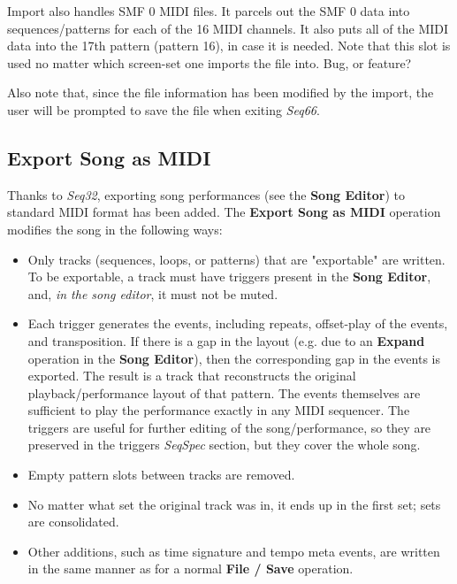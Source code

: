    Import also handles SMF 0 MIDI files.  It parcels out the SMF 0 data
   into sequences/patterns for each of the 16 MIDI channels.  It also puts
   all of the MIDI data into the 17th pattern (pattern 16), in case it is
   needed.  Note that this slot is used no matter which screen-set one imports
   the file into.  Bug, or feature?

   Also note that, since the file information has been modified by the import,
   the user will be prompted to save the file when exiting \textsl{Seq66}.

\subsection{Export Song as MIDI}
\label{subsec:midi_export_file_export}

   Thanks to \textsl{Seq32}, exporting song performances (see the
   \textbf{Song Editor}) to standard MIDI format has been added.
   The \textbf{Export Song as MIDI} operation modifies the song in the
   following ways:

   \begin{itemize}
      \item Only tracks (sequences, loops, or patterns)
         that are "exportable" are written.  To be exportable, a
         track must have triggers present
         in the \textbf{Song Editor}, and, \textsl{in the song editor}, it
         must not be muted.
      \item Each trigger generates the events, including repeats,
         offset-play of the events, and transposition.
         If there is a gap in the layout
         (e.g. due to an \textbf{Expand} operation in the
         \textbf{Song Editor}),
         then the corresponding gap in the events is exported.
         The result is a track that reconstructs the original
         playback/performance layout of that pattern.
         The events themselves are sufficient to play the performance exactly
         in any MIDI sequencer.
         The triggers are useful for further editing of the song/performance,
         so they are preserved in the triggers \textsl{SeqSpec} section, but
         they cover the whole song.
      \item Empty pattern slots between tracks are removed.
      \item No matter what set the original track was in, it ends up in the
         first set; sets are consolidated.
      \item Other additions, such as time signature and tempo meta events, are
         written in the same manner as for a normal \textbf{File / Save}
         operation.
   \end{itemize}

